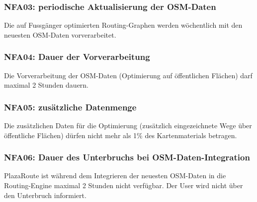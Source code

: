 \subsubsection{NFA03: periodische Aktualisierung der OSM-Daten}
\label{NFA:NFA03}

Die auf Fussgänger optimierten Routing-Graphen werden wöchentlich mit den neuesten \ac{OSM}-Daten vorverarbeitet.

\subsubsection{NFA04: Dauer der Vorverarbeitung}
\label{NFA:NFA04}

Die Vorverarbeitung der \ac{OSM}-Daten (Optimierung auf öffentlichen Flächen) darf maximal 2 Stunden dauern.

\subsubsection{NFA05: zusätzliche Datenmenge}
\label{NFA:NFA05}

Die zusätzlichen Daten für die Optimierung (zusätzlich eingezeichnete Wege über öffentliche Flächen) dürfen nicht mehr als 1\% des Kartenmaterials betragen.

\subsubsection{NFA06: Dauer des Unterbruchs bei OSM-Daten-Integration}
\label{NFA:NFA06}

PlazaRoute ist während dem Integrieren der neuesten \ac{OSM}-Daten in die Routing-Engine maximal 2 Stunden nicht verfügbar. Der User wird nicht über den Unterbruch informiert.

